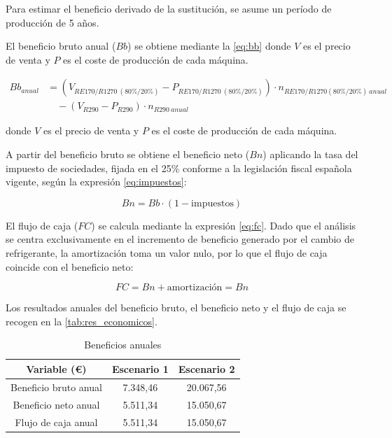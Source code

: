 \documentclass[../main.tex]{subfiles}
\begin{document}
Para estimar el beneficio derivado de la sustitución, se asume un período de producción de 5 años.

El beneficio bruto anual ($Bb$) se obtiene mediante la \ref{eq:bb} donde $V$ es el precio de venta y $P$ es el coste de producción de cada máquina.

\begin{equation}
\begin{aligned}
Bb_{anual} &= (V_{RE170/R1270\ (80\%/20\%)} - P_{RE170/R1270\ (80\%/20\%)}) \cdot n_{RE170/R1270 (80\%/20\%)\ anual} \\
&\quad - (V_{R290} - P_{R290}) \cdot n_{R290\ anual}
\end{aligned}
\label{eq:bb}
\end{equation}

donde $V$ es el precio de venta y $P$ es el coste de producción de cada máquina.

A partir del beneficio bruto se obtiene el beneficio neto ($Bn$) aplicando la tasa del impuesto de sociedades, fijada en el 25\% conforme a la legislación fiscal española vigente, según la expresión \ref{eq:impuestos}:

\begin{equation}
    Bn = Bb \cdot (1 - \text{impuestos})
    \label{eq:impuestos}
\end{equation}

El flujo de caja ($FC$) se calcula mediante la expresión \ref{eq:fc}. Dado que el análisis se centra exclusivamente en el incremento de beneficio generado por el cambio de refrigerante, la amortización toma un valor nulo, por lo que el flujo de caja coincide con el beneficio neto:

\begin{equation}
    FC = Bn + \text{amortización} = Bn
    \label{eq:fc}
\end{equation}

Los resultados anuales del beneficio bruto, el beneficio neto y el flujo de caja se recogen en la \autoref{tab:res_economicos}.

\begin{table}[ht]
\centering
\begin{tabular}{|c|c|c|}
\hline
\textbf{Variable (€)} & \textbf{Escenario 1} & \textbf{Escenario 2} \\ \hline
Beneficio bruto anual & 7.348,46 & 20.067,56 \\ \hline
Beneficio neto anual & 5.511,34 & 15.050,67 \\ \hline
Flujo de caja anual & 5.511,34 & 15.050,67 \\ \hline
\end{tabular}
\caption{Beneficios anuales}
\label{tab:res_economicos}
\end{table}
\end{document}
